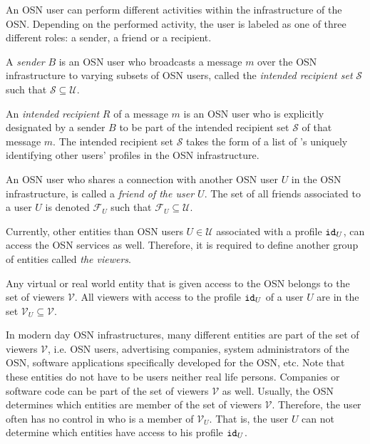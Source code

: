 An OSN user can perform different activities within the infrastructure of the OSN. Depending on the performed activity, the user is labeled as one of three different roles: a sender, a friend or a recipient.

\begin{defn}[Sender]
\label{def:sender}
 A \textit{sender} $B$ is an OSN user who broadcasts a message $m$ over the OSN infrastructure to varying subsets of OSN users, called the \textit{intended recipient set} $\mathcal{S}$ such that $\mathcal{S} \subseteq \mathcal{U}$.
\end{defn}

\begin{defn}
\label{def:recipient}
 An \textit{intended recipient} $R$ of a message $m$ is an OSN user who is explicitly designated by a sender $B$ to be part of the intended recipient set $\mathcal{S}$ of that message $m$. The intended recipient set $\mathcal{S}$ takes the form of a list of \id{}'s uniquely identifying other users' profiles in the OSN infrastructure.
\end{defn}

\begin{defn}[Friend]
\label{def:friend}
 An OSN user who shares a connection with another OSN user $U$ in the OSN infrastructure, is called a \textit{friend of the user $U$}. The set of all friends associated to a user $U$ is denoted $\mathcal{F}_U$ such that $\mathcal{F}_U \subseteq \mathcal{U}$.
\end{defn}

Currently, other entities than OSN users $U \in \mathcal{U}$ associated with a profile $\mathtt{id}_{U}$, can access the OSN services as well. Therefore, it is required to define another group of entities called \textit{the viewers}.

\begin{defn}[Viewer]
\label{def:viewer}
 Any virtual or real world entity that is given access to the OSN belongs to the set of viewers $\mathcal{V}$. All viewers with access to the profile $\mathtt{id}_{U}$ of a user $U$ are in the set $\mathcal{V}_U \subseteq \mathcal{V}$.
\end{defn}

In modern day OSN infrastructures, many different entities are part of the set of viewers $\mathcal{V}$, i.e. OSN users, advertising companies, system administrators of the OSN, software applications specifically developed for the OSN, etc. Note that these entities do not have to be users neither real life persons. Companies or software code can be part of the set of viewers $\mathcal{V}$ as well. Usually, the OSN determines which entities are member of the set of viewers $\mathcal{V}$. Therefore, the user often has no control in who is a member of $\mathcal{V}_U$. That is, the user $U$ can not determine which entities have access to his profile $\mathtt{id}_{U}$.

